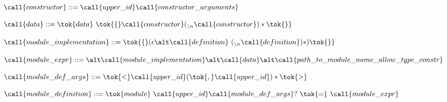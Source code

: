  
   \item $\call{constructor} ::= \call{upper\_id}\call{constructor\_arguments}$
    

  \item $\call{data} ::= \tok{data}\ \tok{\{} \call{constructor} ({}_{\backslash{}n} \call{constructor} )* \tok{\}}$
   
 
   \item $\call{module\_implementation} ::= \tok{\{} (\epsilon \alt
   \call{definition}\ ({}_{\backslash{}n}\call{definition})* ) \tok{\}}$
    
 
   \item $\call{module\_expr} ::=\\
   \alt \call{module\_implementation}\\
   \alt \call{data}\\
   \alt \call{path\_to\_module\_name\_allow\_type\_constr}$
    
 
   \item $\call{module\_def\_args} ::= \tok{<} \call{upper\_id}
   (\tok{,} \call{upper\_id})* \tok{>}$\\
   \item $\call{module\_definition} ::= 
   \tok{module}\ \call{upper\_id}\call{module\_def\_args}?\ \tok{=}\ \call{module\_expr}$
    
